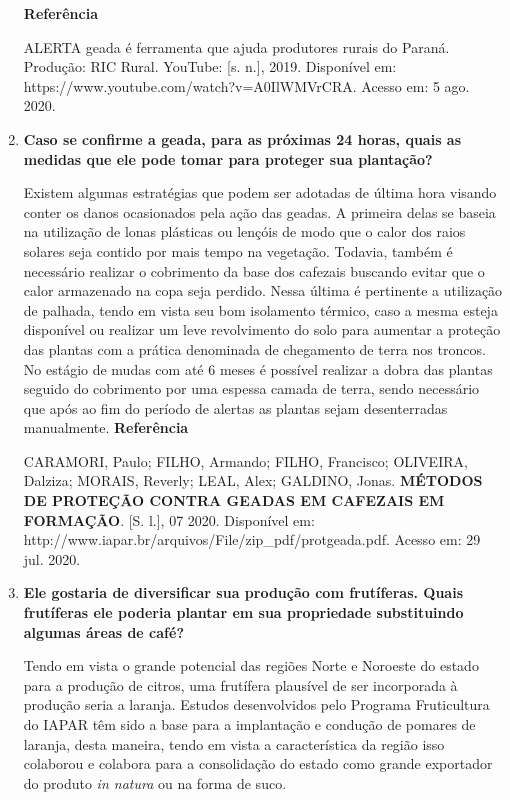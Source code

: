 \documentclass[a4paper, 12pt, brazilian]{article}
\begin{document}
\begin{enumerate}
		\textbf{Referência}
		
		ALERTA geada é ferramenta que ajuda produtores rurais do Paraná. Produção: RIC Rural. YouTube: [s. n.], 2019. Disponível em: https://www.youtube.com/watch?v=A0Il\-WMVrCRA. Acesso em: 5 ago. 2020.
		
		\item\textbf{Caso se confirme a geada, para as próximas 24 horas, quais as medidas que ele pode tomar para proteger sua plantação?}
		
		\hspace{.5cm}Existem algumas estratégias que podem ser adotadas de última hora visando conter os danos ocasionados pela ação das geadas. A primeira delas se baseia na utilização de lonas plásticas ou lençóis de modo que o calor dos raios solares seja contido por mais tempo na vegetação. Todavia, também é necessário realizar o cobrimento da base dos cafezais buscando evitar que o calor armazenado na copa seja perdido. Nessa última é pertinente a utilização de palhada, tendo em vista seu bom isolamento térmico, caso a mesma esteja disponível ou realizar um leve revolvimento do solo para aumentar a proteção das plantas com a prática denominada de chegamento de terra nos troncos.
		No estágio de mudas com até 6 meses é possível realizar a dobra das plantas seguido do cobrimento por uma espessa camada de terra, sendo necessário que após ao fim do período de alertas as plantas sejam desenterradas manualmente.
		\newpage
		\textbf{Referência}
		
		CARAMORI, Paulo; FILHO, Armando; FILHO, Francisco; OLIVEIRA, Dalziza; MORAIS, Reverly; LEAL, Alex; GALDINO, Jonas. \textbf{MÉTODOS DE PROTEÇÃO CONTRA GEADAS EM CAFEZAIS EM FORMAÇÃO}. [S. l.], 07 2020. Disponível em: http://www.iapar.br/arquivos/File/zip\_pdf/protgeada.pdf. Acesso em: 29 jul. 2020.
		
		\item\textbf{Ele gostaria de diversificar sua produção com frutíferas. Quais frutíferas ele poderia plantar em sua propriedade substituindo algumas áreas de café?}
		
		\hspace{.5cm}Tendo em vista o grande potencial das regiões Norte e Noroeste do estado para a produção de citros, uma frutífera plausível de ser incorporada à produção seria a laranja. Estudos desenvolvidos pelo Programa Fruticultura do IAPAR têm sido a base para a implantação e condução de pomares de laranja, desta maneira, tendo em vista a característica da região isso colaborou e colabora para a consolidação do estado como grande exportador do produto \textit{in natura} ou na forma de suco.
		

\end{enumerate}
\end{document}
